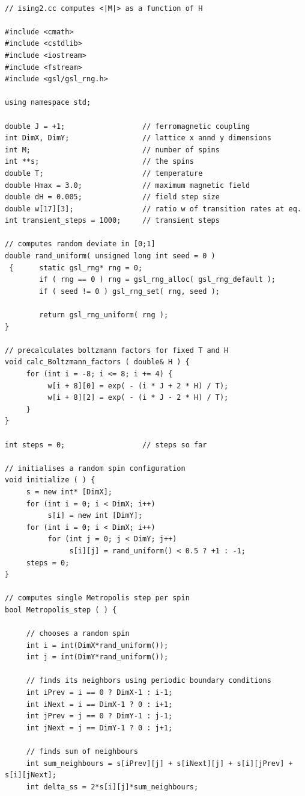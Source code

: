 \documentclass[a4paper]{article}
\begin{document}
\begin{verbatim}

// ising2.cc computes <|M|> as a function of H

#include <cmath>
#include <cstdlib>
#include <iostream>
#include <fstream>
#include <gsl/gsl_rng.h>

using namespace std;

double J = +1;                  // ferromagnetic coupling
int DimX, DimY;                 // lattice x annd y dimensions
int M;                          // number of spins
int **s;                        // the spins
double T;                       // temperature
double Hmax = 3.0;              // maximum magnetic field
double dH = 0.005;              // field step size
double w[17][3];                // ratio w of transition rates at eq.
int transient_steps = 1000;     // transient steps

// computes random deviate in [0;1]
double rand_uniform( unsigned long int seed = 0 )
 {      static gsl_rng* rng = 0;
        if ( rng == 0 ) rng = gsl_rng_alloc( gsl_rng_default );
        if ( seed != 0 ) gsl_rng_set( rng, seed );

        return gsl_rng_uniform( rng );
}

// precalculates boltzmann factors for fixed T and H
void calc_Boltzmann_factors ( double& H ) {
     for (int i = -8; i <= 8; i += 4) {
          w[i + 8][0] = exp( - (i * J + 2 * H) / T);
          w[i + 8][2] = exp( - (i * J - 2 * H) / T);
     }
}

int steps = 0;                  // steps so far

// initialises a random spin configuration
void initialize ( ) {
     s = new int* [DimX];
     for (int i = 0; i < DimX; i++)
          s[i] = new int [DimY];
     for (int i = 0; i < DimX; i++)
          for (int j = 0; j < DimY; j++)
               s[i][j] = rand_uniform() < 0.5 ? +1 : -1;
     steps = 0;
}

// computes single Metropolis step per spin
bool Metropolis_step ( ) {

     // chooses a random spin
     int i = int(DimX*rand_uniform());
     int j = int(DimY*rand_uniform());

     // finds its neighbors using periodic boundary conditions
     int iPrev = i == 0 ? DimX-1 : i-1;
     int iNext = i == DimX-1 ? 0 : i+1;
     int jPrev = j == 0 ? DimY-1 : j-1;
     int jNext = j == DimY-1 ? 0 : j+1;

     // finds sum of neighbours
     int sum_neighbours = s[iPrev][j] + s[iNext][j] + s[i][jPrev] + s[i][jNext];
     int delta_ss = 2*s[i][j]*sum_neighbours;


\end{verbatim}
\end{document}
